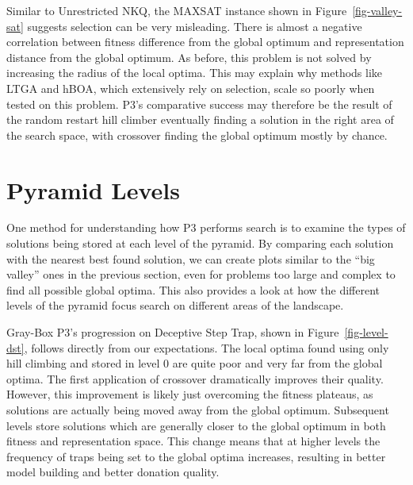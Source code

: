 \begin{figure*}
  \centering
  \caption{Location and quality of local optima in comparison to the global optima for a representative MAX-SAT problem
           with $N=36$.}
  \label{fig-valley-sat}
\end{figure*}

Similar to Unrestricted NKQ, the MAXSAT instance shown in Figure~\ref{fig-valley-sat} suggests selection can be very misleading.
There is almost a negative correlation between fitness difference from the global optimum and representation distance from the
global optimum. As before, this problem is not solved by increasing the radius of the local optima.
This may explain why methods like LTGA and hBOA, which extensively rely on selection,
scale so poorly when tested on this problem. P3's comparative success may therefore be the result of the random restart hill climber
eventually finding a solution in the right area of the search space, with crossover finding the global optimum mostly by chance.

\section{Pyramid Levels}
One method for understanding how P3 performs search is to examine the types of solutions being stored at each level
of the pyramid. By comparing each solution with the nearest best found solution, we can create plots similar to the ``big valley''
ones in the previous section, even for problems too large and complex to find all possible global optima. 
This also provides a look at how the different levels of the pyramid focus search on different areas of the landscape.

\begin{figure*}
  \centering
  \caption{Distribution of local optima stored at each level of Gray-Box P3 in relation to the global optimum on
           the Deceptive Step Trap problem $N=6000$ and traps of size 5.}
  \label{fig-level-dst}
\end{figure*}

Gray-Box P3's progression on Deceptive Step Trap, shown in Figure~\ref{fig-level-dst}, follows directly from our expectations.
The local optima found using only hill climbing and stored in level 0 are quite poor and very far from the global optima.
The first application of crossover dramatically improves their quality. However, this improvement is likely just overcoming
the fitness plateaus, as solutions are actually being moved away from the global optimum. Subsequent levels store solutions
which are generally closer to the global optimum in both fitness and representation space. This change means that at higher
levels the frequency of traps being set to the global optima increases, resulting in better model building and better donation quality.


